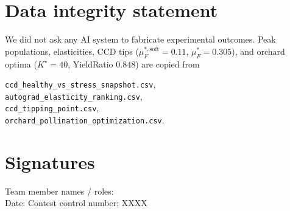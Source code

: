 \documentclass[11pt]{article}
\begin{document}
\section{Data integrity statement}
We did not ask any AI system to fabricate experimental outcomes. Peak
populations, elasticities, CCD tips
(\(\mu_F^{\ast,\mathrm{soft}}=0.11\),
\(\mu_F^{\ast}=0.305\)), and orchard optima
(\(K^\star=40\), YieldRatio \(0.848\)) are copied from
\begin{center}
\texttt{ccd\_healthy\_vs\_stress\_snapshot.csv},\\
\texttt{autograd\_elasticity\_ranking.csv},\\
\texttt{ccd\_tipping\_point.csv},\\
\texttt{orchard\_pollination\_optimization.csv}.
\end{center}

\section{Signatures}
\begin{flushleft}
Team member names / roles: \underline{\hspace{3.2in}}\\[1.2em]
Date: \underline{\hspace{1.6in}} \hfill Contest control number: XXXX
\end{flushleft}
\end{document}
